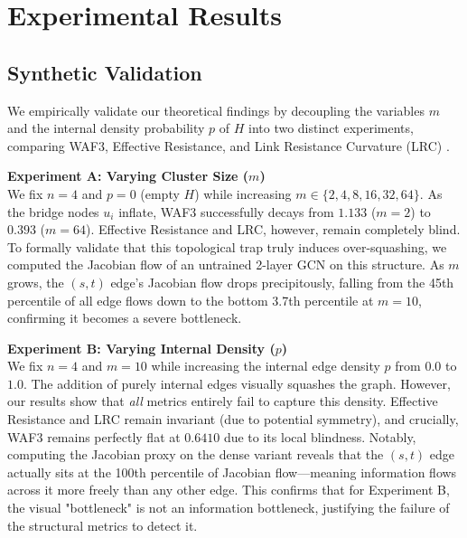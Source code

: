 \documentclass[10pt]{article} %
\begin{document}
\section{Experimental Results}
\subsection{Synthetic Validation}
We empirically validate our theoretical findings by decoupling the variables $m$ and the internal density probability $p$ of $H$ into two distinct experiments, comparing WAF3, Effective Resistance, and Link Resistance Curvature (LRC) \citep{Devriendt2022}.

\textbf{Experiment A: Varying Cluster Size ($m$)} \\
We fix $n=4$ and $p=0$ (empty $H$) while increasing $m \in \{2, 4, 8, 16, 32, 64\}$. As the bridge nodes $u_i$ inflate, WAF3 successfully decays from $1.133$ ($m=2$) to $0.393$ ($m=64$). Effective Resistance and LRC, however, remain completely blind. To formally validate that this topological trap truly induces over-squashing, we computed the Jacobian flow of an untrained 2-layer GCN on this structure. As $m$ grows, the $(s,t)$ edge's Jacobian flow drops precipitously, falling from the 45th percentile of all edge flows down to the bottom 3.7th percentile at $m=10$, confirming it becomes a severe bottleneck.

\textbf{Experiment B: Varying Internal Density ($p$)} \\
We fix $n=4$ and $m=10$ while increasing the internal edge density $p$ from $0.0$ to $1.0$. The addition of purely internal edges visually squashes the graph. However, our results show that \textit{all} metrics entirely fail to capture this density. Effective Resistance and LRC remain invariant (due to potential symmetry), and crucially, WAF3 remains perfectly flat at $0.6410$ due to its local blindness. Notably, computing the Jacobian proxy on the dense variant reveals that the $(s,t)$ edge actually sits at the 100th percentile of Jacobian flow---meaning information flows across it more freely than any other edge. This confirms that for Experiment B, the visual "bottleneck" is not an information bottleneck, justifying the failure of the structural metrics to detect it.
\end{document}
